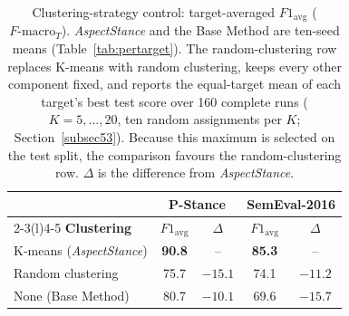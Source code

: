 \documentclass[pdflatex,sn-mathphys-num,iicol]{sn-jnl}%
\begin{document}
\begin{table}[t]
	\caption{Clustering-strategy control: target-averaged \(F1_{\mathrm{avg}}\) (\(F\text{-}\mathrm{macro}_T\)). \textit{AspectStance} and the Base Method are ten-seed means (Table~\ref{tab:pertarget}). The random-clustering row replaces K-means with random clustering, keeps every other component fixed, and reports the equal-target mean of each target's best test score over 160 complete runs (\(K=5,\ldots,20\), ten random assignments per \(K\); Section~\ref{subsec53}). Because this maximum is selected on the test split, the comparison favours the random-clustering row. \(\Delta\) is the difference from \textit{AspectStance}.}
	\label{tab:random}
	\centering
	\tablebodyfont
	\setlength{\tabcolsep}{2pt}
	\renewcommand{\arraystretch}{1.15}
	\begin{tabular*}{\linewidth}{@{\extracolsep{\fill}}lcccc@{}}
		\toprule
		& \multicolumn{2}{c}{\textbf{P-Stance}} & \multicolumn{2}{c}{\textbf{SemEval-2016}} \\
		\cmidrule(lr){2-3}\cmidrule(l){4-5}
		\textbf{Clustering} & \(F1_{\mathrm{avg}}\) & \(\Delta\) & \(F1_{\mathrm{avg}}\) & \(\Delta\) \\
		\midrule
		K-means (\textit{AspectStance}) & \textbf{90.8} & -- & \textbf{85.3} & -- \\
		Random clustering & 75.7 & \(-15.1\) & 74.1 & \(-11.2\) \\
		None (Base Method) & 80.7 & \(-10.1\) & 69.6 & \(-15.7\) \\
		\bottomrule
	\end{tabular*}
\end{table}
\end{document}
